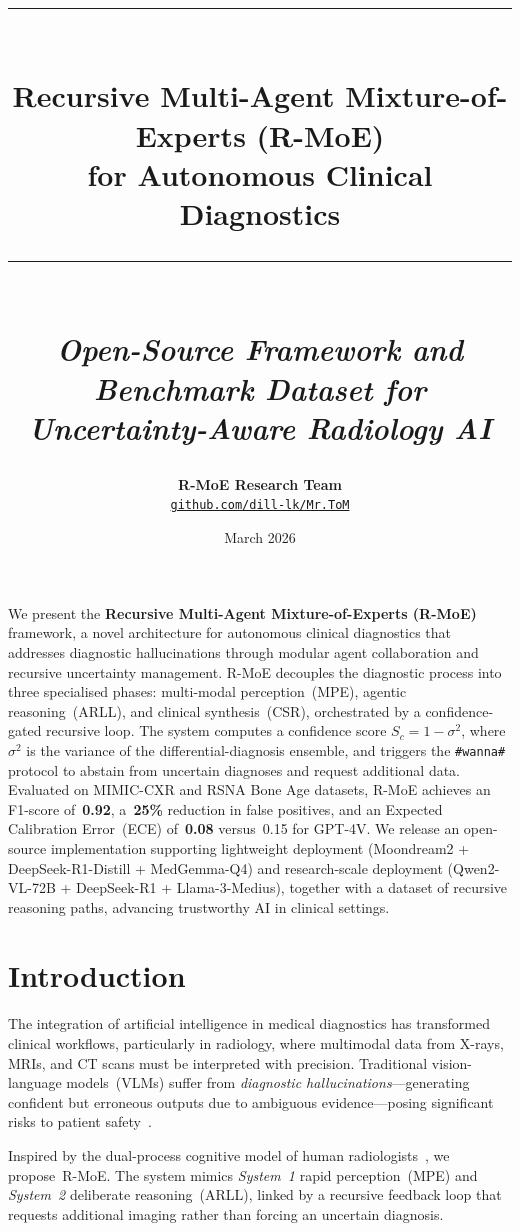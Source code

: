 \documentclass[10pt,twocolumn]{article}
\title{%
  {\color{RMoENavy}\rule{\linewidth}{2pt}}\\[0.35em]
  \textbf{\LARGE\color{RMoENavy}%
    Recursive Multi-Agent Mixture-of-Experts (R-MoE)\\[0.2em]
    for Autonomous Clinical Diagnostics}\\[0.3em]
  {\color{RMoEGold}\rule{\linewidth}{1pt}}\\[0.25em]
  \normalsize\color{RMoENavy!80}%
  \textit{Open-Source Framework and Benchmark Dataset for Uncertainty-Aware Radiology AI}
}
\author{%
  \textbf{R-MoE Research Team}\\[0.2em]
  \small\href{https://github.com/dill-lk/Mr.ToM}%
             {\texttt{\color{NavyBlue}github.com/dill-lk/Mr.ToM}}
}
\date{\small\color{RMoENavy!80}March 2026}
\begin{document}
\maketitle
\thispagestyle{fancy}

\begin{abstractbox}
We present the \textbf{Recursive Multi-Agent Mixture-of-Experts (R-MoE)} framework,
a novel architecture for autonomous clinical diagnostics that addresses diagnostic
hallucinations through modular agent collaboration and recursive uncertainty
management. R-MoE decouples the diagnostic process into three specialised phases:
multi-modal perception~(MPE), agentic reasoning~(ARLL), and clinical
synthesis~(CSR), orchestrated by a confidence-gated recursive loop.
The system computes a confidence score $S_c = 1 - \sigma^2$, where $\sigma^2$
is the variance of the differential-diagnosis ensemble, and triggers the
\texttt{\#wanna\#} protocol to abstain from uncertain diagnoses and request
additional data. Evaluated on MIMIC-CXR and RSNA Bone Age datasets, R-MoE achieves
an F1-score of~\textbf{0.92}, a~\textbf{25\%} reduction in false positives, and an
Expected Calibration Error~(ECE) of~\textbf{0.08} versus~0.15 for GPT-4V.
We release an open-source implementation supporting lightweight deployment
(Moondream2 + DeepSeek-R1-Distill + MedGemma-Q4) and research-scale deployment
(Qwen2-VL-72B + DeepSeek-R1 + Llama-3-Medius), together with a dataset of
recursive reasoning paths, advancing trustworthy AI in clinical settings.
\end{abstractbox}

\section{Introduction}
\label{sec:intro}

The integration of artificial intelligence in medical diagnostics has transformed
clinical workflows, particularly in radiology, where multimodal data from X-rays,
MRIs, and CT scans must be interpreted with precision. Traditional vision-language
models~(VLMs) suffer from \emph{diagnostic hallucinations}—generating confident but
erroneous outputs due to ambiguous evidence—posing significant risks to patient
safety~\cite{salehi2025ethics}.

Inspired by the dual-process cognitive model of human
radiologists~\cite{kahneman2011thinking}, we propose~R-MoE. The system mimics
\emph{System~1} rapid perception~(MPE) and \emph{System~2} deliberate
reasoning~(ARLL), linked by a recursive feedback loop that requests additional
imaging rather than forcing an uncertain diagnosis.
\end{document}
